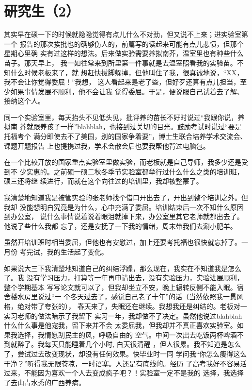 \documentclass[12pt]{book}
\begin{document}
\section{研究生（2）}
\label{sec-5-2}

其实早在硕一下的时候就隐隐觉得有点儿什么不对劲，但又说不上来；进实验室第一个
报告的那次挨批也的确够伤人的，前篇写的读起来可能有点儿悲愤，但那个星期心里确
实有过这样的想法。后来做实验需要养拟南芥，温室里也有种些什么苗子。那天早上，
我一如往常来到所里第一件事就是去温室照看我的实验苗。不知什么时候老板来了，就
想赶快拔脚躲掉，但他叫住了我，很真诚地说，“XX，我不会让你觉得委屈！”我想，
这人看起来是老了些，但好歹还算有点儿担当，至少如果事情发展不顺利，他不会让我
觉得委屈。于是，便说服自己试着去了解、接纳这个人。

同一个实验室里，每天抬头不见低头见，批评养的苗长不好时说过“我跟你说，养拟南
芥就跟养孩子一样”blahblah，也接到过关切的目光。鼓励考试时说过“要是托福考个
满分即使去不了美国，别的国家争着要”，博士生联合培养学术交流会、课题开题报告
上也提携过我，学术会散会后也要我帮他背过电脑包。

在一个比较开放的国家重点实验室里做实验，而老板就是自己导师，我多少还是受到不
少实惠的。之前硕一硕二秋冬季节实验室都举行过什么什么之类的培训班，硕三还将继
续进行，而就在这个向往过的培训里，我却被整蒙了。

我清楚地知道我是被管实验的张老师找个借口开出去了，开出到整个培训之外。但我却
没能想明白究竟是为什么，心中充满了委屈。培训结束后一次不知什么原因到办公室，
说什么事情说着说着眼泪就掉下来，办公室里其它老师就都出去了。他说了些什么我都
忘了，还是安抚了一下我的情绪，周末带我们去涮小肥羊。

虽然开培训班时相当委屈，但他也有安慰过，加上还要考托福也很快就忘掉了。一月份
考完试，我的生活起了变化。

如果说大三下我清楚地知道自己的纠结浮躁，那么现在，我实在不知道我是怎么了。我
没有学习压力，打算等一年再申请出去，没有实验压力，实验进展顺利，整个学期基本
写写论文就可以了，但我却坐立不安，晚上辗转反侧不能入眠。宿舍楼水房里说过“一
个冬天过去了，感觉自己老了十年”的话（当然依照我一贯风格，绝对带了夸张的），
春天来了，失眠还在继续。我想我还是纠结的。老板对一实习老师的做法暗示了我留下
实习一年，我却做不了决定。虽然他说过blahblah什么什么事是他宠我，留下来并不会
太委屈我，但我却并不真正喜欢实验室。如果我选择，我情愿刮民主的风，呼吸自由的
空气。中间一次出去吃饭两杯啤酒不到就醉了。我每天只能睡着几个小时, 白天很清醒
，但人很累。我不知道是怎么了，尝试过去改变现状，却没有任何效果。快毕业时一同
学问我“你怎么瘦得这么干净？”听得我无限苍凉，一时语塞。人还是有底线的。经历
了高考我好不容易活过来，不能因为喜欢一个人去变成疯子吧？！实验室一定不是我的
选择，我选择了去山青水秀的广西养病。
\end{document}
